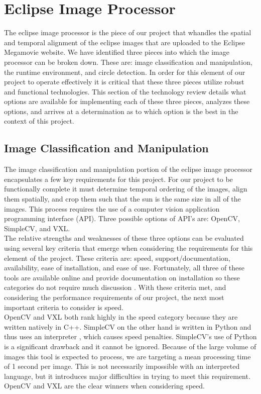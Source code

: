 \documentclass[10pt, onecolumn, draftclsnofoot, letterpaper, compsoc]{IEEEtran}
\begin{document}
\section{Eclipse Image Processor}

The eclipse image processor is the piece of our project that whandles the spatial
and temporal alignment of the eclipse images that are uploaded to the Eclipse
Megamovie website. We have identified three pieces into which
the image processor can be broken down. These are: image classification and
manipulation, the runtime environment, and circle detection. In order for this
element of our project to operate effectively it is critical that these three
pieces utilize robust and functional technologies. This section of the
technology review details what options are available for implementing each of
these three pieces, analyzes these options, and arrives at a determination as to
which option is the best in the context of this project.\\

\subsection{Image Classification and Manipulation}

The image classification and manipulation portion of the eclipse image processor
encapsulates a few key requirements for this project. For our project to be
functionally complete it must determine temporal ordering of the images, align
them spatially, and crop them such that the sun is the same size in all of the
images. This process requires the use of a computer vision application
programming interface (API). Three possible options of API's are: OpenCV,
SimpleCV, and VXL. \\

The relative strengths and weaknesses of these three options can be evaluated
using several key criteria that emerge when considering the requirements for
this element of the project. These criteria are: speed, support/documentation,
availability, ease of installation, and ease of use. Fortunately, all three of
these tools are available online and provide documentation on installation so
these categories do not require much discussion \cite{OCV, VXL, SCV}. With these
criteria met, and considering the performance requirements of our project, the
next most important criteria to consider is speed. \\

OpenCV and VXL both rank highly in the speed category because they are written
natively in C++\cite{OCV, VXL}. SimpleCV on the other hand is written in Python
and thus uses an interpreter \cite{SCV}, which causes speed penalties.
SimpleCV’s use of Python is a significant drawback and it cannot be ignored.
Because of the large volume of images this tool is expected to process, we are
targeting a mean processing time of 1 second per image. This is not necessarily
impossible with an interpreted language, but it introduces major difficulties in
trying to meet this requirement. OpenCV and VXL are the clear winners when
considering speed. \\
\end{document}
